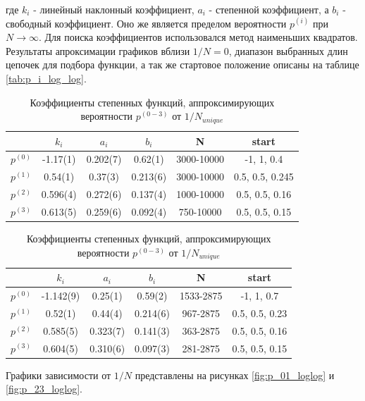 где $k_i$ - линейный наклонный коэффициент, $a_i$ - степенной коэффициент, а $b_i$ - свободный коэффициент. 
Оно же является пределом вероятности $p^{(i)}$ при $N \to \infty$.
Для поиска коэффициентов использовался метод наименьших квадратов.
Результаты апроксимации графиков вблизи $1/N = 0$, диапазон выбранных длин цепочек для подбора функции,
а так же стартовое положение описаны на таблице \ref{tab:p_i_log_log}. 

\begin{table}[h] 
\centering
\begin{tabular}{|c|c|c|c|c|c|}
\hline
 & $k_i$ & $a_i$ & $b_i$ & N & start  \\ \hline
$p^{(0)}$ & -1.17(1) & 0.202(7) & 0.62(1) & 3000-10000 & -1, 1, 0.4 \\ \hline 
$p^{(1)}$ & 0.54(1) & 0.37(3) & 0.213(6) & 3000-10000 & 0.5, 0.5, 0.245 \\ \hline
$p^{(2)}$ & 0.596(4) & 0.272(6) & 0.137(4) & 1000-10000 & 0.5, 0.5, 0.16 \\ \hline
$p^{(3)}$ & 0.613(5) & 0.259(6) & 0.092(4) & 750-10000 & 0.5, 0.5, 0.15 \\ \hline
\end{tabular}
\caption{Коэффициенты степенных функций, аппроксимирующих вероятности $p^{(0-3)}$ от $1/N$, описанных на графиках \ref{fig:p_01_loglog} и \ref{fig:p_23_loglog}}
\label{tab:p_i_log_log}

\begin{tabular}{|c|c|c|c|c|c|} \hline
 & $k_i$ & $a_i$ & $b_i$ & N & start  \\ \hline
$p^{(0)}$ & -1.142(9) & 0.25(1) & 0.59(2) & 1533-2875 &  -1, 1, 0.7 \\ \hline
$p^{(1)}$ & 0.52(1) & 0.44(4) & 0.214(6) & 967-2875 & 0.5, 0.5, 0.23\\ \hline
$p^{(2)}$ & 0.585(5) & 0.323(7) & 0.141(3) & 363-2875  & 0.5, 0.5, 0.16\\ \hline
$p^{(3)}$ & 0.604(5) & 0.310(6) & 0.097(3) & 281-2875 & 0.5, 0.5, 0.15\\ \hline
\end{tabular}

\caption{Коэффициенты степенных функций, аппроксимирующих вероятности $p^{(0-3)}$ от $1/N_{unique}$}
\label{tab:p_iu_log_log}
\end{table}

Графики зависимости от $1/N$ представлены на рисунках \ref{fig:p_01_loglog} и \ref{fig:p_23_loglog}.

